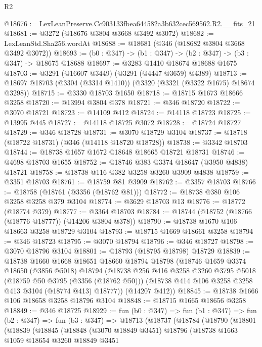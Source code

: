 \begin{lexlean}{R2}
\begin{coremodule}
@18676 := LexLeanPreserve.Cc903133fbea644582a3b632cec569562.R2.__fits_21
@18681 := @3272 (@18676 @3804 @3668 @3492 @3072)
@18682 := LexLeanStd.Sha256.wordAt
@18688 := @18681 (@346 (@18682 @3804 @3668 @3492 @3072))
@18693 := (b0 : @347) -> (b1 : @347) -> (b2 : @347) -> (b3 : @347) -> @18675 @18688
@18697 := @3283 @1410 @18674 @18688 @1675
@18703 := @3291 (@16607 @3449) (@3291 (@4447 @3659) @4389)
@18713 := @18697 @18703 (@3304 (@3314 @1410)) (@3320 (@3321 (@3322 @1675) @18674 @3298))
@18715 := @3330 @18703 @1650
@18718 := @18715 @1673 @18666 @3258
@18720 := @13994 @3804 @378
@18721 := @346 @18720
@18722 := @3070 @18721
@18723 := @14109 @412
@18724 := @14118 @18723
@18725 := @13995 @445
@18727 := @14118 @18725 @3072
@18728 := @18724 @18727
@18729 := @346 @18728
@18731 := @3070 @18729 @3104
@18737 := @18718 (@18722 @18731) (@346 (@14118 @18720 @18728))
@18738 := @3342 @18703
@18744 := @18738 @1657 @1672 @18648 @18665 @18721 @18731
@18746 := @4698 @18703 @1655
@18752 := @18746 @383 @3374 @18647 (@3950 @4838) @18721
@18758 := @18738 @116 @382 @3258 @3260 @3909 @4838
@18759 := @3351 @18703
@18761 := @18759 @81 @3909
@18762 := @3357 @18703
@18766 := @18758 (@18761 (@3356 (@18762 @81)))
@18772 := @18738 @380 @106 @3258 @3258 @379 @3104
@18774 := @3629 @18703 @13
@18776 := @18772 (@18774 @379)
@18777 := @3364 @18703
@18784 := @18744 (@18752 (@18766 (@18776 @18777)) (@14206 @3804 @378))
@18790 := @18738 @1670 @106 @18663 @3258 @18729 @3104
@18793 := @18715 @1669 @18661 @3258
@18794 := @346 @18723
@18795 := @3070 @18794
@18796 := @346 @18727
@18798 := @3070 @18796 @3104
@18801 := @18793 (@18795 @18798) @18729
@18839 := @18738
    @1660
    @1668
    @18651
    @18660
    @18794
    @18798
    (@18746
      @1659
      @3374
      @18650
      (@3856 @5018)
      @18794
      (@18738
        @256
        @416
        @3258
        @3260
        @3795
        @5018
        (@18759 @50 @3795 (@3356 (@18762 @50)))
        (@18738 @414 @106 @3258 @3258 @413 @3104 (@18774 @413) @18777))
      (@14207 @412))
@18845 := @18738 @1666 @106 @18658 @3258 @18796 @3104
@18848 := @18715 @1665 @18656 @3258
@18849 := @346 @18725
@18929 := fun (b0 : @347) =>
  fun (b1 : @347) =>
  fun (b2 : @347) =>
  fun (b3 : @347) =>
  @18713
    (@18737
      (@18784
        (@18790
          (@18801
            (@18839
              (@18845
                (@18848
                  (@3070 @18849 @3451)
                  @18796
                  (@18738
                    @1663
                    @1059
                    @18654
                    @3260
                    @18849
                    @3451

\end{coremodule}
\end{lexlean}
